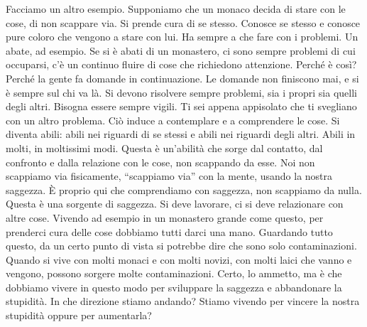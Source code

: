 Facciamo un altro esempio. Supponiamo che un monaco decida di stare con
le cose, di non scappare via. Si prende cura di se stesso. Conosce se
stesso e conosce pure coloro che vengono a stare con lui. Ha sempre a
che fare con i problemi. Un abate, ad esempio. Se si è abati di un
monastero, ci sono sempre problemi di cui occuparsi, c'è un continuo
fluire di cose che richiedono attenzione. Perché è così? Perché la gente
fa domande in continuazione. Le domande non finiscono mai, e si è sempre
sul chi va là. Si devono risolvere sempre problemi, sia i propri sia
quelli degli altri. Bisogna essere sempre vigili. Ti sei appena
appisolato che ti svegliano con un altro problema. Ciò induce a
contemplare e a comprendere le cose. Si diventa abili: abili nei
riguardi di se stessi e abili nei riguardi degli altri. Abili in molti,
in moltissimi modi. Questa è un'abilità che sorge dal contatto, dal
confronto e dalla relazione con le cose, non scappando da esse. Noi non
scappiamo via fisicamente, ``scappiamo via'' con la mente, usando la
nostra saggezza. È proprio qui che comprendiamo con saggezza, non
scappiamo da nulla. Questa è una sorgente di saggezza. Si deve lavorare,
ci si deve relazionare con altre cose. Vivendo ad esempio in un
monastero grande come questo, per prenderci cura delle cose dobbiamo
tutti darci una mano. Guardando tutto questo, da un certo punto di vista
si potrebbe dire che sono solo contaminazioni. Quando si vive con molti
monaci e con molti novizi, con molti laici che vanno e vengono, possono
sorgere molte contaminazioni. Certo, lo ammetto, ma è che dobbiamo
vivere in questo modo per sviluppare la saggezza e abbandonare la
stupidità. In che direzione stiamo andando? Stiamo vivendo per vincere
la nostra stupidità oppure per aumentarla?


